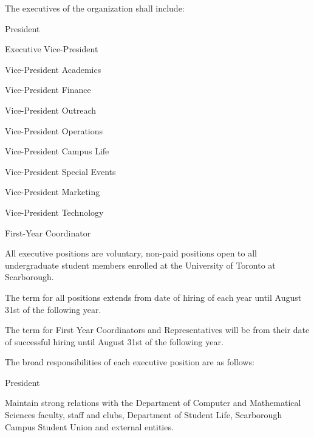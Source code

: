 \documentclass[12pt,a4paper]{article}
\begin{document}
\begin{constitutionlist}
\item The executives of the organization shall include:

\begin{constitutionlist}
\item President

\item Executive Vice-President

\item Vice-President Academics

\item Vice-President Finance

\item Vice-President Outreach

\item Vice-President Operations

\item Vice-President Campus Life

\item Vice-President Special Events

\item Vice-President Marketing

\item Vice-President Technology

\item First-Year Coordinator
\end{constitutionlist}

\item All executive positions are voluntary, non-paid positions open to all undergraduate student members enrolled at the University of Toronto at Scarborough.

\item The term for all positions extends from date of hiring of each year until August 31st of the following year.

\item The term for First Year Coordinators and Representatives will be from their date of successful hiring until August 31st of the following year.

\item The broad responsibilities of each executive position are as follows:

\begin{constitutionlist}
\item President

\begin{constitutionlist}
\item Maintain strong relations with the Department of Computer and Mathematical Sciences faculty, staff and clubs, Department of Student Life, Scarborough Campus Student Union and external entities.


\end{constitutionlist}
\end{constitutionlist}
\end{constitutionlist}
\end{document}
